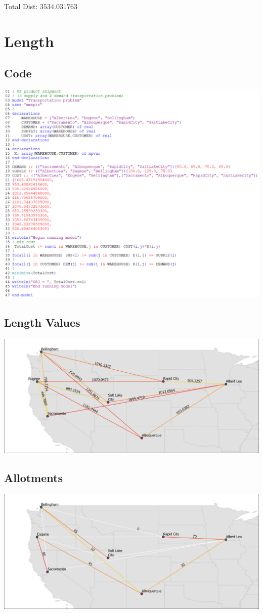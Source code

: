 \documentclass[12pt]{article}
\theoremstyle{definition}
\begin{document}
Total Dist: $3534.031763$

\newpage
\section{Length}
\subsection{Code}
\includegraphics[width=\textwidth]{codelen.png}
\newpage
\subsection{Length Values}
\includegraphics[width=\textwidth]{maplen.png}
\subsection{Allotments}
\includegraphics[width=\textwidth]{solmapdist.png}
\end{document}
